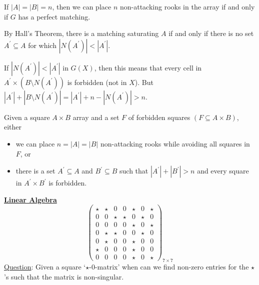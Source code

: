 \begin{Proposition}{}{}
    If $ |A|=|B|=n $, then we can place $ n $ non-attacking rooks in the array
    if and only if $ G $ has a perfect matching.
\end{Proposition}

By Hall's Theorem, there is a matching saturating $ A $ if and only if there
is no set $ A^\prime \subseteq A $ for which $ |N(A^\prime)|<|A^\prime| $.

If $ |N(A^\prime)|<|A^\prime| $ in $ G(X) $, then this means that every cell in $ A^\prime\times
    (B\setminus N(A^\prime)) $ is forbidden (not in $ X $).
But $ |A^\prime|+|B\setminus N(A^\prime)|= |A^\prime|+n-|N(A^\prime)|>n $.


\begin{Proposition}{}{}
    Given a square $ A\times B $ array and a set $ F $ of forbidden squares
    $ (F\subseteq A\times B) $, either
    \begin{itemize}
        \item we can place $ n=|A|=|B| $ non-attacking rooks while avoiding all squares
              in $ F $, or
        \item there is a set $ A^\prime\subseteq A $ and $ B^\prime\subseteq B $
              such that $ |A^\prime|+|B^\prime|>n $ and every square in $ A^\prime\times B^\prime $
              is forbidden.
    \end{itemize}
\end{Proposition}


\textbf{\underline{Linear Algebra}}
\[ \begin{pmatrix}
        \star & \star & 0     & 0     & \star & 0     & \star \\
        0     & 0     & \star & \star & 0     & \star & 0     \\
        0     & 0     & 0     & 0     & \star & 0     & \star \\
        0     & \star & \star & 0     & 0     & \star & 0     \\
        0     & \star & 0     & 0     & \star & 0     & 0     \\
        \star & 0     & 0     & 0     & \star & 0     & 0     \\
        0     & 0     & 0     & 0     & \star & 0     & \star
    \end{pmatrix}_{7\times 7}
\]
\underline{Question}: Given a square `$ \star $-$ 0 $-matrix' when can we find
non-zero entries for the $ \star $'s such that the matrix is non-singular.

